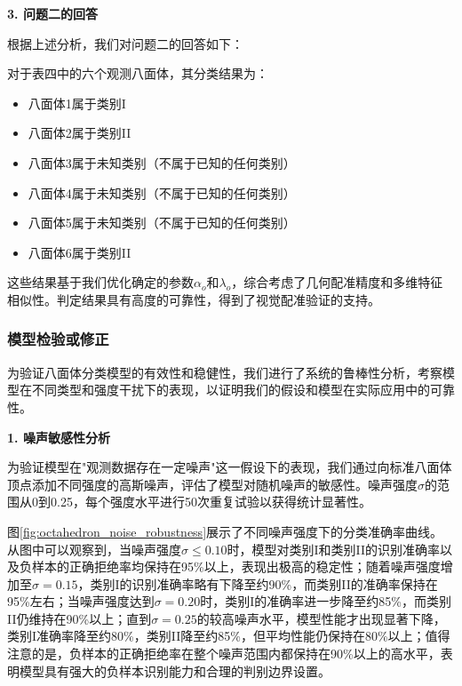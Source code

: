 \textbf{3. 问题二的回答}

根据上述分析，我们对问题二的回答如下：

对于表四中的六个观测八面体，其分类结果为：
    \begin{itemize}
        \item 八面体1属于类别I
        \item 八面体2属于类别II
\item 八面体3属于未知类别（不属于已知的任何类别）
\item 八面体4属于未知类别（不属于已知的任何类别）
\item 八面体5属于未知类别（不属于已知的任何类别）
        \item 八面体6属于类别II
    \end{itemize}
    
这些结果基于我们优化确定的参数$\alpha_o$和$\lambda_o$，综合考虑了几何配准精度和多维特征相似性。判定结果具有高度的可靠性，得到了视觉配准验证的支持。

\subsubsection{模型检验或修正}

为验证八面体分类模型的有效性和稳健性，我们进行了系统的鲁棒性分析，考察模型在不同类型和强度干扰下的表现，以证明我们的假设和模型在实际应用中的可靠性。

\textbf{1. 噪声敏感性分析}

为验证模型在"观测数据存在一定噪声"这一假设下的表现，我们通过向标准八面体顶点添加不同强度的高斯噪声，评估了模型对随机噪声的敏感性。噪声强度$\sigma$的范围从0到0.25，每个强度水平进行50次重复试验以获得统计显著性。

图\ref{fig:octahedron_noise_robustness}展示了不同噪声强度下的分类准确率曲线。从图中可以观察到，当噪声强度$\sigma \leq 0.10$时，模型对类别I和类别II的识别准确率以及负样本的正确拒绝率均保持在95\%以上，表现出极高的稳定性；随着噪声强度增加至$\sigma = 0.15$，类别I的识别准确率略有下降至约90\%，而类别II的准确率保持在95\%左右；当噪声强度达到$\sigma = 0.20$时，类别I的准确率进一步降至约85\%，而类别II仍维持在90\%以上；直到$\sigma = 0.25$的较高噪声水平，模型性能才出现显著下降，类别I准确率降至约80\%，类别II降至约85\%，但平均性能仍保持在80\%以上；值得注意的是，负样本的正确拒绝率在整个噪声范围内都保持在90\%以上的高水平，表明模型具有强大的负样本识别能力和合理的判别边界设置。
    

